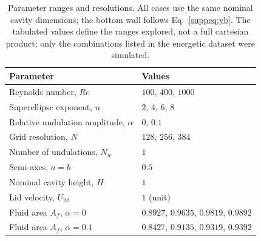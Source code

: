 \begin{table}[!htbp]
\centering
\caption{Parameter ranges and resolutions. All cases use the same nominal cavity dimensions; the bottom wall follows Eq.~\eqref{suppeq:yb}. The tabulated values define the ranges explored, not a full cartesian product; only the combinations listed in the energetic dataset were simulated.}
\label{supptab:config}
\begin{tabular}{@{}ll@{}}
\hline
Parameter & Values \\
\hline
Reynolds number, $Re$ & $100$, $400$, $1000$ \\
Superellipse exponent, $n$ & $2$, $4$, $6$, $8$ \\
Relative undulation amplitude, $\alpha$ & $0$, $0.1$ \\
Grid resolution, $N$ & $128$, $256$, $384$ \\
Number of undulations, $N_w$ & $1$ \\
Semi-axes, $a=b$ & $0.5$ \\
Nominal cavity height, $H$ & $1$ \\
Lid velocity, $U_{\mathrm{lid}}$ & $1$ (unit) \\
\hline
Fluid area $A_f$, $\alpha=0$ & $0.8927$, $0.9635$, $0.9819$, $0.9892$ \\
Fluid area $A_f$, $\alpha=0.1$ & $0.8427$, $0.9135$, $0.9319$, $0.9392$ \\
\hline
\end{tabular}
\end{table}
